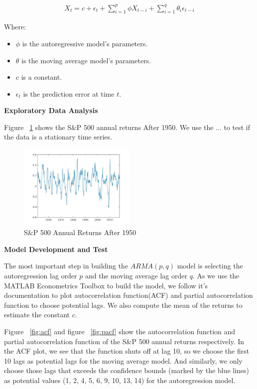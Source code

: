 \documentclass{article}
\begin{document}
\begin{align*}
    X_t=c+\epsilon_t+\sum_{i=1}^p\phi X_{t-i}+\sum_{i=1}^q\theta_i\epsilon_{t-i}
\end{align*}

Where:
\begin{itemize}
    \item $\phi$ is the autoregressive model's parameters.
    \item $\theta$ is the moving average model's parameters.
    \item c is a constant.
    \item $\epsilon_t$ is the prediction error at time $t$.
\end{itemize}

\textbf{Exploratory Data Analysis}

Figure ~\ref{fig:returns} shows the S\&P 500 annual returns After 1950. We use the ... to test if the data is a stationary time series. 

\begin{figure}[h!]
    \centering
        \includegraphics[width=0.5\textwidth]{sp500-annual-increase.jpg}
    \caption{S\&P 500 Annual Returns After 1950}
    \label{fig:returns}
\end{figure}

\vspace{\baselineskip}
\textbf{Model Development and Test}

The most important step in building the $ARMA(p, q)$ model is selecting the autoregression lag order $p$ and the moving average lag order $q$. As we use the MATLAB Econometrics Toolbox to build the model, we follow it's documentation\cite{lags} to plot autocorrelation function(ACF) and partial autocorrelation function to choose potential lags. We also compute the mean of the returns to estimate the constant $c$.

Figure ~\ref{fig:acf} and figure ~\ref{fig:pacf} show the autocorrelation function and partial autocorrelation function of the S\&P 500 annual returns respectively. In the ACF plot, we see that the function shuts off at lag 10, so we choose the first 10 lags as potential lags for the moving average model. And similarly, we only choose those lags that exceeds the confidence bounds (marked by the blue lines) as potential values (1, 2, 4, 5, 6, 9, 10, 13, 14) for the autoregression model.
\end{document}
